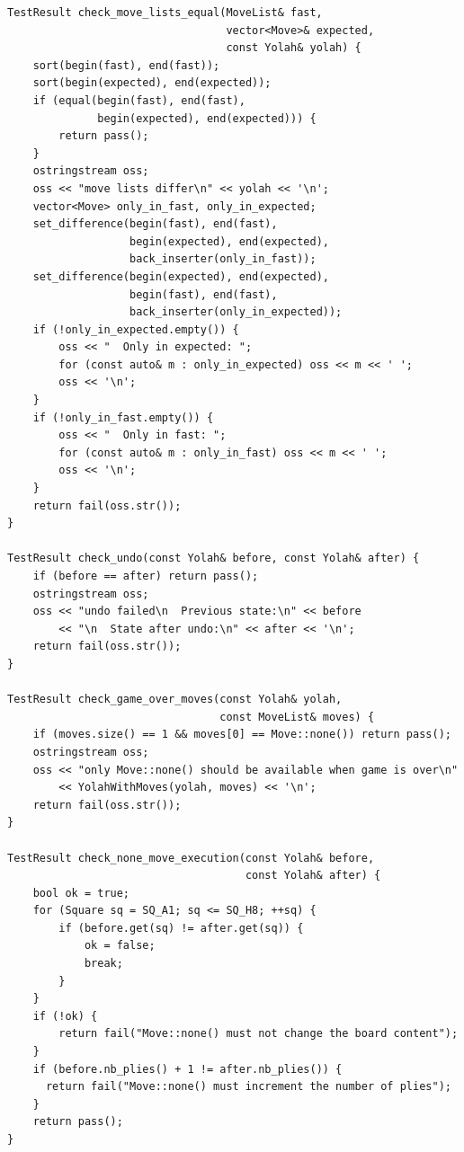 \documentclass[12pt,a4paper,twoside,openright]{book}
\begin{document}
\begin{mdframed}[skipabove=\baselineskip,topline=false,rightline=false,bottomline=false,leftline=false,linewidth=1pt,linecolor=gray!40,innerleftmargin=8pt]
\begin{verbatim}
TestResult check_move_lists_equal(MoveList& fast, 
                                  vector<Move>& expected, 
                                  const Yolah& yolah) {
    sort(begin(fast), end(fast));
    sort(begin(expected), end(expected));
    if (equal(begin(fast), end(fast), 
              begin(expected), end(expected))) {
        return pass();
    }
    ostringstream oss;
    oss << "move lists differ\n" << yolah << '\n';
    vector<Move> only_in_fast, only_in_expected;
    set_difference(begin(fast), end(fast), 
                   begin(expected), end(expected), 
                   back_inserter(only_in_fast));
    set_difference(begin(expected), end(expected), 
                   begin(fast), end(fast), 
                   back_inserter(only_in_expected));
    if (!only_in_expected.empty()) {
        oss << "  Only in expected: ";
        for (const auto& m : only_in_expected) oss << m << ' ';
        oss << '\n';
    }
    if (!only_in_fast.empty()) {
        oss << "  Only in fast: ";
        for (const auto& m : only_in_fast) oss << m << ' ';
        oss << '\n';
    }
    return fail(oss.str());
}

TestResult check_undo(const Yolah& before, const Yolah& after) {
    if (before == after) return pass();
    ostringstream oss;
    oss << "undo failed\n  Previous state:\n" << before
        << "\n  State after undo:\n" << after << '\n';
    return fail(oss.str());
}

TestResult check_game_over_moves(const Yolah& yolah, 
                                 const MoveList& moves) {
    if (moves.size() == 1 && moves[0] == Move::none()) return pass();
    ostringstream oss;
    oss << "only Move::none() should be available when game is over\n"
        << YolahWithMoves(yolah, moves) << '\n';
    return fail(oss.str());
}

TestResult check_none_move_execution(const Yolah& before, 
                                     const Yolah& after) {
    bool ok = true;
    for (Square sq = SQ_A1; sq <= SQ_H8; ++sq) {
        if (before.get(sq) != after.get(sq)) {
            ok = false;
            break;
        }
    }
    if (!ok) {
        return fail("Move::none() must not change the board content");
    }
    if (before.nb_plies() + 1 != after.nb_plies()) {
      return fail("Move::none() must increment the number of plies");
    }
    return pass();
}


\end{verbatim}
\end{mdframed}
\end{document}
